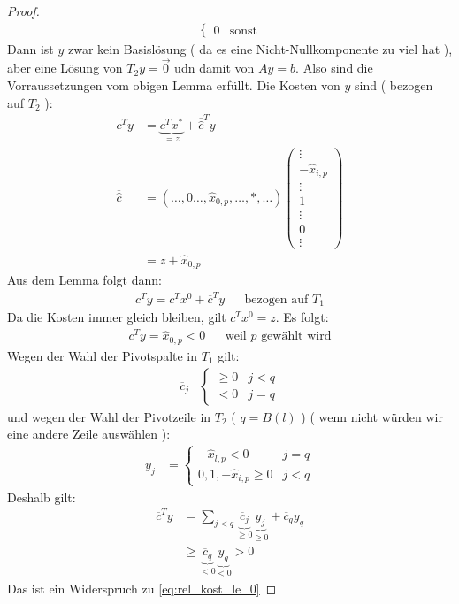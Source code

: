\begin{proof}
\begin{align*}
\begin{cases}
0 & \text{sonst}
\end{cases}
\end{align*}
Dann ist $y$ zwar kein Basislösung ( da es eine Nicht-Nullkomponente zu viel hat ), aber eine Lösung von $T_2y = \vec{0}$ udn damit von $Ay = b$.
Also sind die Vorraussetzungen vom obigen Lemma erfüllt.
Die Kosten von $y$ sind ( bezogen auf $T_2$ ):
\begin{align*}
c^Ty &= \underbrace{c^Tx^*}_{=z} + \overline{\hat{c}}^T y\\
\overline{\hat{c}} &= (\dotsc, 0 \dotsc, \hat{x}_{0,p}, \dotsc, * , \dotsc) \begin{pmatrix}
\vdots \\
-\hat{x}_{i,p} \\
\vdots \\
1 \\
\vdots \\
0 \\
\vdots
\end{pmatrix} \\
&= z + \hat{x}_{0,p}
\end{align*}
Aus dem Lemma folgt dann:
\begin{align*}
c^Ty = c^Tx^0 + \overline{c}^Ty &&\text{bezogen auf $T_1$}
\end{align*}
Da die Kosten immer gleich bleiben, gilt $c^Tx^0 = z$. Es folgt:
\begin{align}
\overline{c}^Ty = \hat{x}_{0,p} < 0 &&\text{weil $p$ gewählt wird}
\label{eq:rel_kost_le_0}
\end{align}
Wegen der Wahl der Pivotspalte in $T_1$ gilt:
\begin{align*}
\overline{c}_j & \begin{cases}
\geq 0 & j < q \\
< 0 & j = q
\end{cases}
\end{align*}
und wegen der Wahl der Pivotzeile in $T_2$ ( $q=B(l)$ ) ( wenn nicht würden wir eine andere Zeile auswählen ):
\begin{align*}
y_j &= \begin{cases}
-\hat{x}_{l,p} < 0 & j=q \\
0, 1, -\hat{x}_{i,p} \geq 0 & j<q
\end{cases}
\end{align*}
Deshalb gilt:
\begin{align}
\overline{c}^T y &= \sum_{j < q} \underbrace{\overline{c}_j}_{\geq 0} \underbrace{y_j}_{\geq 0} + \overline{c}_q y_q \nonumber \\
&\geq \underbrace{\overline{c}_q}_{<0} \underbrace{y_q}_{<0} > 0
\end{align}
Das ist ein Widerspruch zu \eqref{eq:rel_kost_le_0}
\end{proof}

